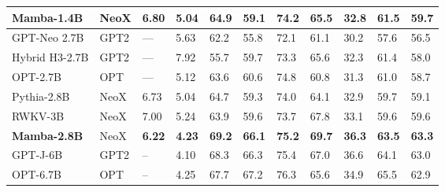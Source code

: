 \begin{table}[!th]
{\begin{tabular}{@{}lllllllllll@{}}
      \textbf{Mamba-1.4B}                               & NeoX        & \textbf{6.80}         & \textbf{5.04}         & \textbf{64.9}        & \textbf{59.1}        & \textbf{74.2}        & \textbf{65.5}        & \textbf{32.8}        & \textbf{61.5}        & \textbf{59.7} \\
      \midrule
      GPT-Neo 2.7B                                      & GPT2        & ---                   & 5.63                  & 62.2                 & 55.8                 & 72.1                 & 61.1                 & 30.2                 & 57.6                 & 56.5 \\
      Hybrid H3-2.7B                                           & GPT2        & ---                   & 7.92                  & 55.7                 & 59.7                 & 73.3                 & 65.6                 & 32.3                 & 61.4                 & 58.0 \\
      OPT-2.7B                                          & OPT         & ---                   & 5.12                  & 63.6                 & 60.6                 & 74.8                 & 60.8                 & 31.3                 & 61.0                 & 58.7 \\
      Pythia-2.8B                                       & NeoX        & 6.73                  & 5.04                  & 64.7                 & 59.3                 & 74.0                 & 64.1                 & 32.9                 & 59.7                 & 59.1 \\
      RWKV-3B                                           & NeoX        & 7.00                  & 5.24                  & 63.9                 & 59.6                 & 73.7                 & 67.8                 & 33.1                 & 59.6                 & 59.6 \\
      \textbf{Mamba-2.8B}                               & NeoX        & \textbf{6.22}         & \textbf{4.23}         & \textbf{69.2}        & \textbf{66.1}        & \textbf{75.2}        & \textbf{69.7}        & \textbf{36.3}        & \textbf{63.5}        & \textbf{63.3} \\
      \midrule
      GPT-J-6B                                          & GPT2        & --                    & 4.10                  & 68.3                 & 66.3                 & 75.4                 & 67.0                 & 36.6                 & 64.1                 & 63.0 \\
      OPT-6.7B                                          & OPT         & --                    & 4.25                  & 67.7                 & 67.2                 & 76.3                 & 65.6                 & 34.9                 & 65.5                 & 62.9 \\

\end{tabular}}
\end{table}
